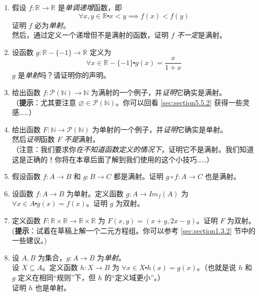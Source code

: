 \begin{enumerate}[label=(\arabic*)]
    \item 假设 $f : \mathbb{R} \to \mathbb{R}$ 是\emph{单调递增}函数，即
        \[\forall x, y \in \mathbb{R} \centerdot x < y \implies f(x) < f(y)\]
        证明 $f$ 必为\emph{单射}。\\
        然后，通过定义一个递增但不是满射的函数，证明 $f$ \emph{不一定}是满射。
    \item 设函数 $g : \mathbb{R} - \{-1\} \to \mathbb{R}$ 定义为 
        \[\forall x \in \mathbb{R} - \{-1\} \centerdot g(x) = \frac{x}{1+x}\]
        $g$ 是\emph{单射}吗？请证明你的声明。
    \item 给出函数 $f : \mathcal{P}(\mathbb{N}) \to \mathbb{N}$ 为满射的一个例子，并\emph{证明}它确实是满射。\\
        （\textbf{提示}：尤其要注意 $\varnothing \in \mathcal{P}(\mathbb{N})$。你可以回看 \ref{sec:section5.5.2} 获得一些灵感……）
    \item 给出函数 $F : \mathbb{N} \to \mathcal{P}(\mathbb{N})$ 为单射的一个例子，并\emph{证明}它确实是单射。\\
        然后\emph{证明}函数 $F$ \emph{不是}满射。\\
        （注意：我们要求你\emph{在不知道函数定义的情况下}，证明它不是满射。我们知道这是正确的！你将在本章后面了解到我们使用的这个小技巧……）
    \item 假设函数 $f : A \to B$ 和 $g : B \to C$ 都是满射。证明 $g \circ f:A \to C$ 也是满射。
    \item 设函数 $f : A \to B$ 为单射。定义函数 $g : A \to Im_f (A)$ 为 $\forall x \in A \centerdot g(x) = f(x)$。证明 $g$ 为双射。
    \item 定义函数 $F:\mathbb{R} \times \mathbb{R} \to \mathbb{R} \times \mathbb{R}$ 为 $F(x, y) = (x+y, 2x-y)$。证明 $F$ 为双射。\\
        (\textbf{提示}：试着在草稿上解一个二元方程组。你可以参考 \ref{sec:section1.3.2} 节中的一些建议。)
    \item 设 $A, B$ 为集合，$g: A \to B$ 为\emph{单射}。\\
        设 $X \subseteq A$。定义函数 $h : X \to B$ 为 $\forall x \in X \centerdot h(x) = g(x)$。（也就是说 $h$ 和 $g$ 定义在相同``规则''下，但 $h$ 的``定义域更小''。）\\
        证明 $h$ 也是单射。
\end{enumerate}